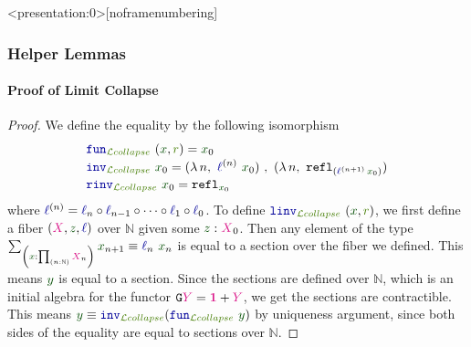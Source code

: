 \documentclass[xelatex,mathserif,serif,notheorems]{beamer} %
\theoremstyle{plain} %
\theoremstyle{definition}
\theoremstyle{remark}
\newcommand*{\term}[1]{\textcolor{green!30!black}{#1}} %
\newcommand*{\pathterm}[1]{\textcolor{green!65!red!75!black}{#1}}
\newcommand*{\type}[1]{\textcolor{magenta!90!black}{#1}}
\newcommand*{\unit}{\type{\textbf{1}}}
\newcommand*{\function}[1]{\textcolor{blue!60!black}{\ensuremath{\mathtt{#1}}}}
\newcommand*{\functor}[1]{\ensuremath{\mathbf{\mathtt{#1}}}}
\newcommand{\setlengths}{
  \setlength{\abovedisplayskip}{4pt}
  \setlength{\belowdisplayskip}{4pt}
  \setlength{\abovedisplayshortskip}{2pt}
  \setlength{\belowdisplayshortskip}{2pt}
}
\begin{document}
\begin{frame}<presentation:0>[noframenumbering] %
  \frametitle{Helper Lemmas}
  \framesubtitle{Proof of Limit Collapse}
    \begin{proof}\setlengths
    We define the equality by the following isomorphism
    \begin{align}
      &\function{fun}_{\pathterm{\mathcal{L}collapse}}~(\term{x} , \pathterm{r}) = \term{x}_0 \\[-1mm]
      &\function{inv}_{\pathterm{\mathcal{L}collapse}}~\term{x}_0 = (\lambda\,n,~\function{\ell}^{(n)}~\term{x}_0)~,~(\lambda\,n,~\mathtt{refl}_{(\function{\ell}^{(n+1)}\,\term{x}_0)}) \\[-1mm]
      &\function{rinv}_{\pathterm{\mathcal{L}collapse}}~\term{x}_0 = \mathtt{refl}_{\term{x}_0}
    \end{align}
    where \(\function{\ell}^{(n)} = \function{\ell}_n \circ \function{\ell}_{n-1} \circ \dots \circ \function{\ell}_1 \circ \function{\ell}_0\). To define \(\function{linv}_{\pathterm{\mathcal{L}collapse}}~(\term{x} , \pathterm{r})\), we first define a fiber \((\type{X} , \term{z}, \function{\ell})\) over \(\mathbb{N}\) given some \(\term{z} : \type{X}_0\). Then any element of the type \(\sum_{\left(\term{x} : \prod_{(n : \mathbb{N})} \type{X}_n\right)} \term{x}_{n + 1} \equiv \function{\ell}_n~\term{x}_n\) is equal to a section over the fiber we defined. This means \(\term{y}\) is equal to a section. Since the sections are defined over \(\mathbb{N}\), which is an initial algebra for the functor \(\functor{G}\type{Y} = \unit + \type{Y}\), we get the sections are contractible. This means \(\term{y} \equiv \function{inv}_{\pathterm{\mathcal{L}collapse}} (\function{fun}_{\pathterm{\mathcal{L}collapse}}~\term{y})\) by uniqueness argument, since both sides of the equality are equal to sections over \(\mathbb{N}\).
  \end{proof}
\end{frame}
\end{document}
